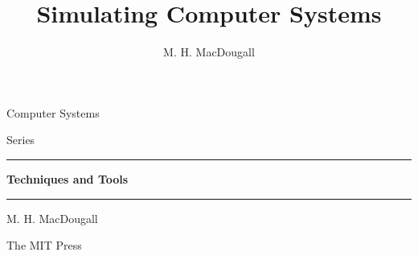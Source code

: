\documentclass[11pt]{book}
\title{Simulating Computer Systems}
\author{M. H. MacDougall}
\date{}
\begin{document}
\begin{titlepage}
  \thispagestyle{empty}
  \pagecolor{coverblue}
  \color{white}
  \sffamily
  \itshape
  \raggedright
  \makeatletter
  {\large Computer Systems\par}
  {\large Series\par}
  \vspace{1.0em}
  {\color{black}\rule{0.8\textwidth}{12pt}}\par
  \vspace{3.8em}
  {\LARGE\bfseries \@title\par}
  \vspace{0.6em}
  {\Large\bfseries Techniques and Tools\par}
  \vspace{5.2em}
  \noindent\hfill{\color{black}\rule{8em}{8pt}}\par
  \vspace{0.5em}
  \noindent\hfill{\large M. H. MacDougall\par}
  \vfill
  {\large The MIT Press\par}
  \makeatother
\end{titlepage}
\nopagecolor





\frontmatter
{}
\setcounter{tocdepth}{1}
\begingroup
\small
\setlength{\parskip}{0pt}
\tableofcontents
\endgroup


\mainmatter









\appendix


\backmatter



\end{document}
